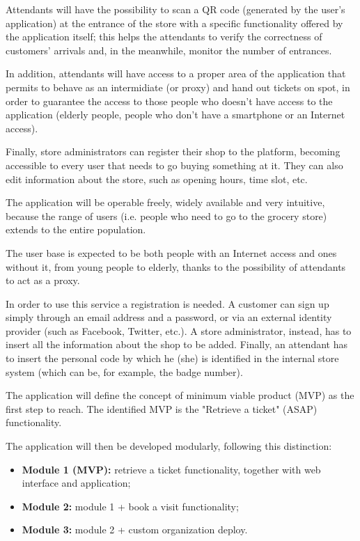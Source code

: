 \documentclass[table, 12pt]{article}
\begin{document}
Attendants will have the possibility to scan a QR code (generated by the user's application) at the entrance of the store with a specific functionality offered by the application itself; this helps the attendants to verify the correctness of customers' arrivals and, in the meanwhile, monitor the number of entrances.

In addition, attendants will have access to a proper area of the application that permits to behave as an intermidiate (or proxy) and hand out tickets on spot, in order to guarantee the access to those people who doesn't have access to the application (elderly people, people who don't have a smartphone or an Internet access).

Finally, store administrators can register their shop to the platform, becoming accessible to every user that needs to go buying something at it. They can also edit information about the store, such as opening hours, time slot, etc.

The application will be operable freely, widely available and very intuitive, because the range of users (i.e. people who need to go to the grocery store) extends to the entire population.

The user base is expected to be both people with an Internet access and ones without it, from young people to elderly, thanks to the possibility of attendants to act as a proxy.

In order to use this service a registration is needed. A customer can sign up simply through an email address and a password, or via an external identity provider (such as Facebook, Twitter, etc.). A store administrator, instead, has to insert all the information about the shop to be added. Finally, an attendant has to insert the personal code by which he (she) is identified in the internal store system (which can be, for example, the badge number).

The application will define the concept of minimum viable product (MVP) as the first step to reach. The identified MVP is the "Retrieve a ticket" (ASAP) functionality.

The application will then be developed modularly, following this distinction:
\begin{itemize}
    \item \textbf{Module 1 (MVP):} retrieve a ticket functionality, together with web interface and application;
    \item \textbf{Module 2:} module 1 + book a visit functionality;
    \item \textbf{Module 3:} module 2 + custom organization deploy.
\end{itemize}
\end{document}
